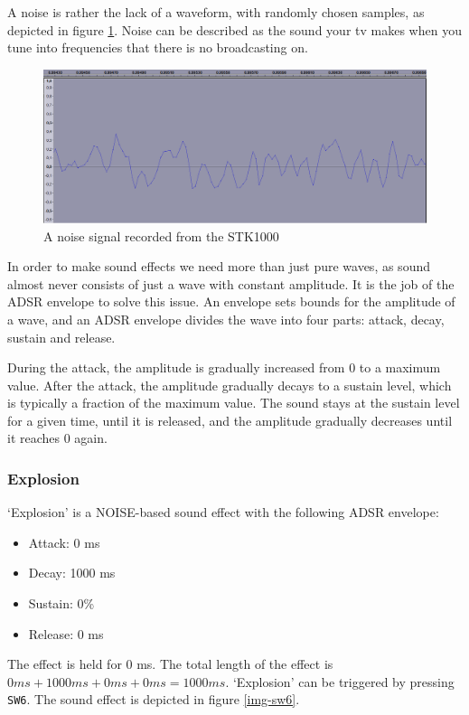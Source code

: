 A noise is rather the lack of a waveform, with randomly chosen samples, as depicted in figure \ref{img-sw6zoom}.
Noise can be described as the sound your tv makes when you tune into frequencies that there is no broadcasting on.
\begin{figure}[H]
	\includegraphics[width = \textwidth]{images/SW6zoom.png}
	\caption{A noise signal recorded from the STK1000}
	\label{img-sw6zoom}
\end{figure}

In order to make sound effects we need more than just pure waves, as sound almost never consists of just a wave with constant amplitude.
It is the job of the ADSR envelope to solve this issue.
An envelope sets bounds for the amplitude of a wave, and an ADSR envelope divides the wave into four parts: attack, decay, sustain and release.

During the attack, the amplitude is gradually increased from 0 to a maximum value.
After the attack, the amplitude gradually decays to a sustain level, which is typically a fraction of the maximum value.
The sound stays at the sustain level for a given time, until it is released, and the amplitude gradually decreases until it reaches 0 again.

\subsubsection{Explosion}

`Explosion' is a NOISE-based sound effect with the following ADSR envelope:
\begin{itemize}
	\item{Attack: 0 ms}
	\item{Decay: 1000 ms}
	\item{Sustain: 0\%}
	\item{Release: 0 ms}
\end{itemize}
The effect is held for 0 ms.
The total length of the effect is $0 ms + 1000 ms + 0 ms + 0 ms = 1000 ms$.
`Explosion' can be triggered by pressing \texttt{SW6}.
The sound effect is depicted in figure \ref{img-sw6}.

